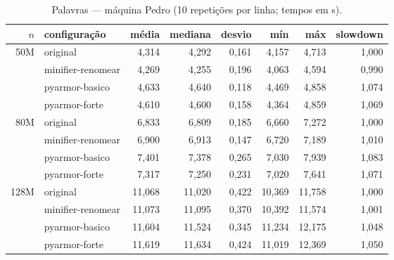\begin{table}[ht]\centering\footnotesize
\caption{Palavras --- máquina Pedro (10 repetições por linha; tempos em s).}\label{tab:pedro-palavras}
\begin{tabular}{rlrrrrrr}\hline
$n$ & configuração & média & mediana & desvio & mín & máx & slowdown \\\hline
50M & original & 4,314 & 4,292 & 0,161 & 4,157 & 4,713 & 1,000 \\
 & minifier-renomear & 4,269 & 4,255 & 0,196 & 4,063 & 4,594 & 0,990 \\
 & pyarmor-basico & 4,633 & 4,640 & 0,118 & 4,469 & 4,858 & 1,074 \\
 & pyarmor-forte & 4,610 & 4,600 & 0,158 & 4,364 & 4,859 & 1,069 \\
\hline
80M & original & 6,833 & 6,809 & 0,185 & 6,660 & 7,272 & 1,000 \\
 & minifier-renomear & 6,900 & 6,913 & 0,147 & 6,720 & 7,189 & 1,010 \\
 & pyarmor-basico & 7,401 & 7,378 & 0,265 & 7,030 & 7,939 & 1,083 \\
 & pyarmor-forte & 7,317 & 7,250 & 0,231 & 7,020 & 7,641 & 1,071 \\
\hline
128M & original & 11,068 & 11,020 & 0,422 & 10,369 & 11,758 & 1,000 \\
 & minifier-renomear & 11,073 & 11,095 & 0,370 & 10,392 & 11,574 & 1,001 \\
 & pyarmor-basico & 11,604 & 11,524 & 0,345 & 11,234 & 12,175 & 1,048 \\
 & pyarmor-forte & 11,619 & 11,634 & 0,424 & 11,019 & 12,369 & 1,050 \\
\hline
\end{tabular}\end{table}


